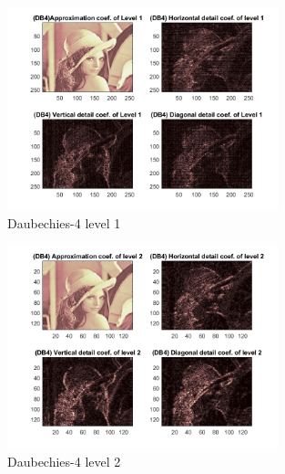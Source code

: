 \documentclass[12pt]{article}
\begin{document}
\begin{enumerate}[leftmargin=\labelsep]
\begin{enumerate}
    \begin{figure}[H]
        \centering
        \includegraphics[width=0.7\textwidth,height=0.7\textwidth]{Figures/DB_1.png}
        \caption{Daubechies-4 level 1}
        \label{Q4_b_level1}
    \end{figure}
    \begin{figure}[H]
        \centering
        \includegraphics[width=0.7\textwidth,height=0.7\textwidth]{Figures/DB_2.png}
        \caption{Daubechies-4 level 2}
        \label{Q4_b_level2}
    \end{figure}


\end{enumerate}
\end{enumerate}
\end{document}
